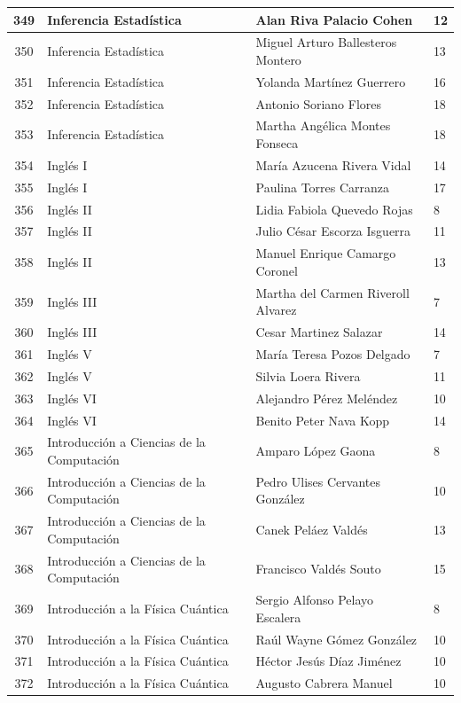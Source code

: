 {\begin{longtable}{|c|p{6.5cm}|p{5cm}|p{1.5cm}|}
  349 & Inferencia Estadística & Alan Riva Palacio Cohen & 12 \\ \hline
  350 & Inferencia Estadística & Miguel Arturo Ballesteros Montero & 13 \\ \hline
  351 & Inferencia Estadística & Yolanda Martínez Guerrero & 16 \\ \hline
  352 & Inferencia Estadística & Antonio Soriano Flores & 18 \\ \hline
  353 & Inferencia Estadística & Martha Angélica Montes Fonseca & 18 \\ \hline
  354 & Inglés I & María Azucena Rivera Vidal & 14 \\ \hline
  355 & Inglés I & Paulina Torres Carranza & 17 \\ \hline
  356 & Inglés II & Lidia Fabiola Quevedo Rojas & 8 \\ \hline
  357 & Inglés II & Julio César Escorza Isguerra & 11 \\ \hline
  358 & Inglés II & Manuel Enrique Camargo Coronel & 13 \\ \hline
  359 & Inglés III & Martha del Carmen Riveroll Alvarez & 7 \\ \hline
  360 & Inglés III & Cesar Martinez Salazar & 14 \\ \hline
  361 & Inglés V & María Teresa Pozos Delgado & 7 \\ \hline
  362 & Inglés V & Silvia Loera Rivera & 11 \\ \hline
  363 & Inglés VI & Alejandro Pérez Meléndez & 10 \\ \hline
  364 & Inglés VI & Benito Peter Nava Kopp & 14 \\ \hline
  365 & Introducción a Ciencias de la Computación & Amparo López Gaona & 8 \\ \hline
  366 & Introducción a Ciencias de la Computación & Pedro Ulises Cervantes González & 10 \\ \hline
  367 & Introducción a Ciencias de la Computación & Canek Peláez Valdés & 13 \\ \hline
  368 & Introducción a Ciencias de la Computación & Francisco Valdés Souto & 15 \\ \hline
  369 & Introducción a la Física Cuántica & Sergio Alfonso Pelayo Escalera & 8 \\ \hline
  370 & Introducción a la Física Cuántica & Raúl Wayne Gómez González & 10 \\ \hline
  371 & Introducción a la Física Cuántica & Héctor Jesús Díaz Jiménez & 10 \\ \hline
  372 & Introducción a la Física Cuántica & Augusto Cabrera Manuel & 10 \\ \hline

\end{longtable}}
